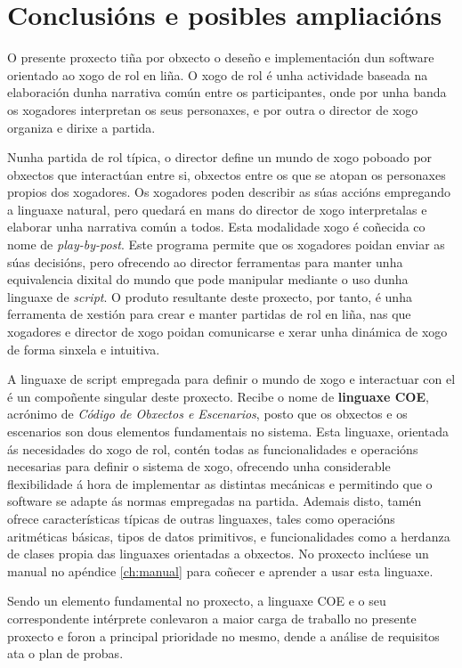 \chapter{Conclusións e posibles ampliacións}
O presente proxecto tiña por obxecto o deseño e implementación dun software
orientado ao xogo de rol en liña. O xogo de rol é unha actividade baseada na
elaboración dunha narrativa común entre os participantes, onde por unha banda os
xogadores interpretan os seus personaxes, e por outra o director de xogo
organiza e dirixe a partida.

Nunha partida de rol típica, o director define un mundo de xogo poboado por
obxectos que interactúan entre si, obxectos entre os que se atopan os personaxes
propios dos xogadores. Os xogadores poden describir as súas accións empregando a
linguaxe natural, pero quedará en mans do director de xogo interpretalas e
elaborar unha narrativa común a todos. Esta modalidade xogo é coñecida co
nome de \textit{play-by-post}. Este programa permite que os xogadores poidan
enviar as súas decisións, pero ofrecendo ao director ferramentas para manter
unha equivalencia dixital do mundo que pode manipular mediante o uso dunha
linguaxe de \textit{script}. O produto resultante deste proxecto, por tanto, é
unha ferramenta de xestión para crear e manter partidas de rol en liña, nas que
xogadores e director de xogo poidan comunicarse e xerar unha dinámica de xogo de
forma sinxela e intuitiva.

A linguaxe de script empregada para definir o mundo de xogo e interactuar con el
é un compoñente singular deste proxecto. Recibe o nome de \textbf{linguaxe COE},
acrónimo de \textit{Código de Obxectos e Escenarios}, posto que os obxectos e os
escenarios son dous elementos fundamentais no sistema. Esta linguaxe, orientada
ás necesidades do xogo de rol, contén todas as funcionalidades e operacións
necesarias para definir o sistema de xogo, ofrecendo unha considerable
flexibilidade á hora de implementar as distintas mecánicas e permitindo que o
software se adapte ás normas empregadas na partida.
Ademais disto, tamén ofrece características típicas de outras linguaxes, tales
como operacións aritméticas básicas, tipos de datos primitivos, e
funcionalidades como a herdanza de clases propia das linguaxes orientadas a
obxectos. No proxecto inclúese un manual no apéndice \ref{ch:manual} para
coñecer e aprender a usar esta linguaxe.

Sendo un elemento fundamental no proxecto, a linguaxe COE e o seu correspondente
intérprete conlevaron a maior carga de traballo no presente proxecto e foron a
principal prioridade no mesmo, dende a análise de requisitos ata o plan de
probas.

